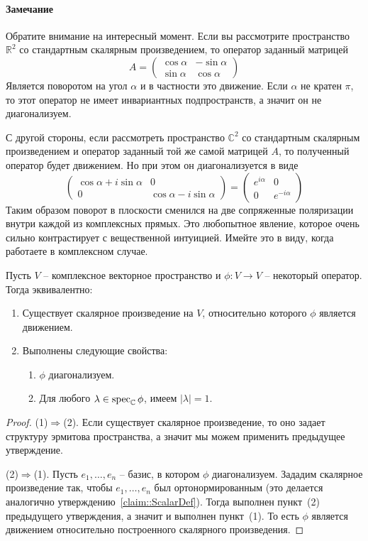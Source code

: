 \paragraph{Замечание}
Обратите внимание на интересный момент. Если вы рассмотрите пространство $\mathbb R^2$ со стандартным скалярным произведением, то оператор заданный матрицей
\[
A =
\begin{pmatrix}
{\cos \alpha}&{-\sin\alpha}\\
{\sin \alpha}&{\cos \alpha}
\end{pmatrix}
\]
Является поворотом на угол $\alpha$ и в частности это движение. Если $\alpha$ не кратен $\pi$, то этот оператор не имеет инвариантных подпространств, а значит он не диагонализуем.

С другой стороны, если рассмотреть пространство $\mathbb C^2$ со стандартным скалярным произведением  и оператор заданный той же самой матрицей $A$, то полученный оператор будет движением. Но при этом он диагонализуется в виде
\[
\begin{pmatrix}
{\cos \alpha + i\sin \alpha}&{0}\\
{0}&{\cos \alpha - i\sin \alpha}
\end{pmatrix}
=
\begin{pmatrix}
{e^{i\alpha}}&{0}\\
{0}&{e^{-i\alpha}}
\end{pmatrix}
\]
Таким образом поворот в плоскости сменился на две сопряженные поляризации внутри каждой из комплексных прямых. Это любопытное явление, которое очень сильно контрастирует с вещественной интуицией. Имейте это в виду, когда работаете в комплексном случае.


\begin{claim}
Пусть $V$ -- комплексное векторное пространство и $\phi\colon V\to V$ -- некоторый оператор. Тогда эквивалентно:
\begin{enumerate}
\item Существует скалярное произведение на $V$, относительно которого $\phi$ является движением.
\item Выполнены следующие свойства:
\begin{enumerate}
\item $\phi$ диагонализуем.
\item Для любого $\lambda\in\operatorname{spec}_\mathbb C\phi$, имеем $|\lambda| = 1$.
\end{enumerate}
\end{enumerate}
\end{claim}
\begin{proof}
(1)$\Rightarrow$(2). Если существует скалярное произведение, то оно задает структуру эрмитова пространства, а значит мы можем применить предыдущее утверждение.

(2)$\Rightarrow$(1). Пусть $e_1,\ldots,e_n$ -- базис, в котором $\phi$ диагонализуем. Зададим скалярное произведение так, чтобы $e_1,\ldots,e_n$ был ортонормированным (это делается аналогично утверждению~\ref{claim::ScalarDef}). Тогда выполнен пункт~(2) предыдущего утверждения, а значит и выполнен пункт~(1). То есть $\phi$ является движением относительно построенного скалярного произведения.
\end{proof}


